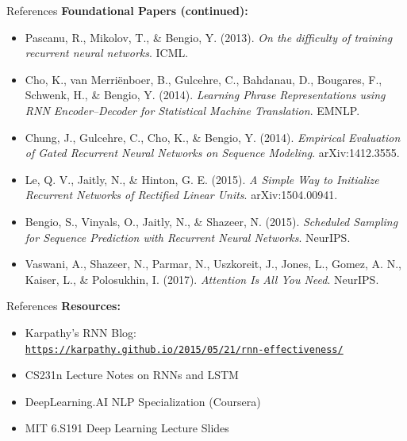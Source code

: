 \begin{frame}{References}
  \small
  \textbf{Foundational Papers (continued):}
  \begin{itemize}
    \item Pascanu, R., Mikolov, T., \& Bengio, Y. (2013). \textit{On the difficulty of training recurrent neural networks}. ICML.
    \item Cho, K., van Merriënboer, B., Gulcehre, C., Bahdanau, D., Bougares, F., Schwenk, H., \& Bengio, Y. (2014). \textit{Learning Phrase Representations using RNN Encoder--Decoder for Statistical Machine Translation}. EMNLP.
    \item Chung, J., Gulcehre, C., Cho, K., \& Bengio, Y. (2014). \textit{Empirical Evaluation of Gated Recurrent Neural Networks on Sequence Modeling}. arXiv:1412.3555.
    \item Le, Q. V., Jaitly, N., \& Hinton, G. E. (2015). \textit{A Simple Way to Initialize Recurrent Networks of Rectified Linear Units}. arXiv:1504.00941.
    \item Bengio, S., Vinyals, O., Jaitly, N., \& Shazeer, N. (2015). \textit{Scheduled Sampling for Sequence Prediction with Recurrent Neural Networks}. NeurIPS.
    \item Vaswani, A., Shazeer, N., Parmar, N., Uszkoreit, J., Jones, L., Gomez, A. N., Kaiser, L., \& Polosukhin, I. (2017). \textit{Attention Is All You Need}. NeurIPS.
  \end{itemize}
\end{frame}

\begin{frame}{References}
  \textbf{Resources:}
  \begin{itemize}
    \item Karpathy's RNN Blog:\\
    \href{https://karpathy.github.io/2015/05/21/rnn-effectiveness/}{\texttt{https://karpathy.github.io/2015/05/21/rnn-effectiveness/}}
    \item CS231n Lecture Notes on RNNs and LSTM
    \item DeepLearning.AI NLP Specialization (Coursera)
    \item MIT 6.S191 Deep Learning Lecture Slides
  \end{itemize}
\end{frame}
